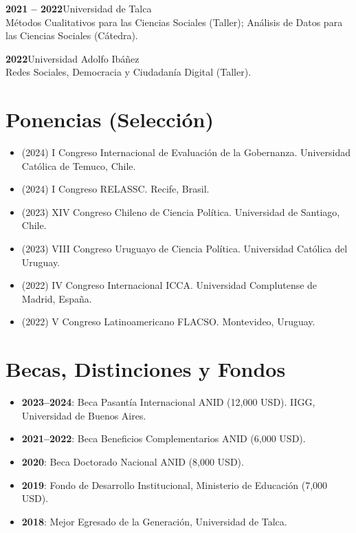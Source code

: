 \documentclass[11pt,a4paper]{article}
\newcommand{\cventry}[2]{\noindent\textbf{#1}\hfill #2\\}
\newcommand{\cventrysub}[1]{\noindent\hspace{0.5cm}#1\par\vspace{2pt}}
\begin{document}
\cventry{2021 -- 2022}{Universidad de Talca}
\cventrysub{Métodos Cualitativos para las Ciencias Sociales (Taller); Análisis de Datos para las Ciencias Sociales (Cátedra).}

\cventry{2022}{Universidad Adolfo Ibáñez}
\cventrysub{Redes Sociales, Democracia y Ciudadanía Digital (Taller).}

\section{Ponencias (Selección)}

\begin{itemize}[leftmargin=*]
    \item (2024) I Congreso Internacional de Evaluación de la Gobernanza. Universidad Católica de Temuco, Chile.
    \item (2024) I Congreso RELASSC. Recife, Brasil.
    \item (2023) XIV Congreso Chileno de Ciencia Política. Universidad de Santiago, Chile.
    \item (2023) VIII Congreso Uruguayo de Ciencia Política. Universidad Católica del Uruguay.
    \item (2022) IV Congreso Internacional ICCA. Universidad Complutense de Madrid, España.
    \item (2022) V Congreso Latinoamericano FLACSO. Montevideo, Uruguay.
\end{itemize}

\section{Becas, Distinciones y Fondos}

\begin{itemize}[leftmargin=*]
    \item \textbf{2023--2024}: Beca Pasantía Internacional ANID (12,000 USD). IIGG, Universidad de Buenos Aires.
    \item \textbf{2021--2022}: Beca Beneficios Complementarios ANID (6,000 USD).
    \item \textbf{2020}: Beca Doctorado Nacional ANID (8,000 USD).
    \item \textbf{2019}: Fondo de Desarrollo Institucional, Ministerio de Educación (7,000 USD).
    \item \textbf{2018}: Mejor Egresado de la Generación, Universidad de Talca.
\end{itemize}
\end{document}
